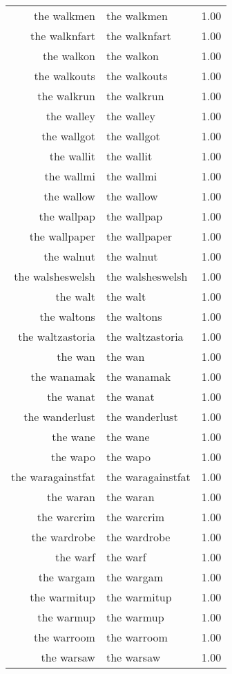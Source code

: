 \begin{table}[ht]
\begin{tabular}{rlr}
  the walkmen & the walkmen & 1.00 \\ 
  the walknfart & the walknfart & 1.00 \\ 
  the walkon & the walkon & 1.00 \\ 
  the walkouts & the walkouts & 1.00 \\ 
  the walkrun & the walkrun & 1.00 \\ 
  the walley & the walley & 1.00 \\ 
  the wallgot & the wallgot & 1.00 \\ 
  the wallit & the wallit & 1.00 \\ 
  the wallmi & the wallmi & 1.00 \\ 
  the wallow & the wallow & 1.00 \\ 
  the wallpap & the wallpap & 1.00 \\ 
  the wallpaper & the wallpaper & 1.00 \\ 
  the walnut & the walnut & 1.00 \\ 
  the walsheswelsh & the walsheswelsh & 1.00 \\ 
  the walt & the walt & 1.00 \\ 
  the waltons & the waltons & 1.00 \\ 
  the waltzastoria & the waltzastoria & 1.00 \\ 
  the wan & the wan & 1.00 \\ 
  the wanamak & the wanamak & 1.00 \\ 
  the wanat & the wanat & 1.00 \\ 
  the wanderlust & the wanderlust & 1.00 \\ 
  the wane & the wane & 1.00 \\ 
  the wapo & the wapo & 1.00 \\ 
  the waragainstfat & the waragainstfat & 1.00 \\ 
  the waran & the waran & 1.00 \\ 
  the warcrim & the warcrim & 1.00 \\ 
  the wardrobe & the wardrobe & 1.00 \\ 
  the warf & the warf & 1.00 \\ 
  the wargam & the wargam & 1.00 \\ 
  the warmitup & the warmitup & 1.00 \\ 
  the warmup & the warmup & 1.00 \\ 
  the warroom & the warroom & 1.00 \\ 
  the warsaw & the warsaw & 1.00 \\ 

\end{tabular}
\end{table}
